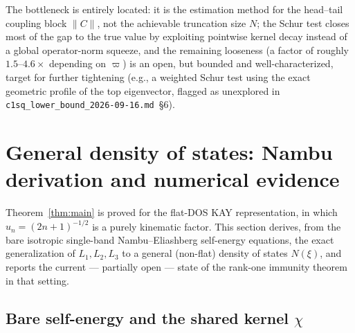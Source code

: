 \documentclass[11pt]{article}
\begin{document}
The bottleneck is entirely located: it is the estimation method for the
head--tail coupling block $\|C\|$, not the achievable truncation size $N$;
the Schur test closes most of the gap to the true value by exploiting
pointwise kernel decay instead of a global operator-norm squeeze, and the
remaining looseness (a factor of roughly $1.5$--$4.6\times$ depending on
$\varpi$) is an open, but bounded and well-characterized, target for further
tightening (e.g., a weighted Schur test using the exact geometric profile
of the top eigenvector, flagged as unexplored in
\texttt{c1sq\_lower\_bound\_2026-09-16.md}~\S6).

\section{General density of states: Nambu derivation and numerical evidence}\label{sec:dos}

Theorem~\ref{thm:main} is proved for the flat-DOS KAY representation, in
which $u_n=(2n+1)^{-1/2}$ is a purely kinematic factor. This section derives,
from the bare isotropic single-band Nambu--Eliashberg self-energy equations,
the exact generalization of $L_1,L_2,L_3$ to a general (non-flat) density of
states $N(\xi)$, and reports the current --- partially open --- state of the
rank-one immunity theorem in that setting.

\subsection{Bare self-energy and the shared kernel $\chi$}
\end{document}
